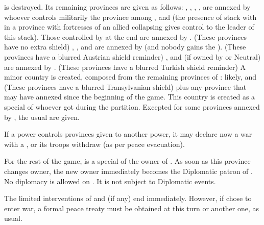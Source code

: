 \aparag \paysHongrie is destroyed. Its remaining provinces are given as
follows:
\bparag \provincePecs, \provinceCroatie, \provinceHongrie, \provinceKarpatok,
\provinceBukovina are annexed by whoever controls militarily the province
among \TUR, \HAB and \POL (the presence of stack with \ARMY\faceplus in a
province with fortresses of an allied collapsing \paysHongrie gives control to
the leader of this stack). Those controlled by \paysHongrie at the end are
annexed by \HAB. (These provinces have no extra shield)
\bparag \provinceSzlovakia, \provinceBalaton, \provinceKranj and
\provinceKapela are annexed by \HAB (and nobody gains the \VP). (These
provinces have a blurred Austrian shield reminder)
\bparag \provinceBanat, \provinceSerbia and \provinceBosnia (if owned by
\paysHongrie or Neutral) are annexed by \TUR. (These provinces have a blurred
Turkish shield reminder)
\bparag A minor country \paysTransylvanie is created, composed from the
remaining provinces of \paysHongrie: likely, \provinceErdely and
\provinceMures (These provinces have a blurred Transylvanian shield) plus any
province that \paysHongrie may have annexed since the beginning of the
game. This country is created as a special \VASSAL of whoever got
\provinceHongrie during the partition.
\bparag Excepted for some provinces annexed by \HAB, the usual \VP are given.

\aparag If a power controls provinces given to another power, it may declare
now a war with a \CB, or its troops withdraw (as per peace evacuation).

\aparag[\paysTransylvanie] [BLP] For the rest of the game, \paysTransylvanie
is a special \VASSAL of the owner of \provinceHongrie.
\bparag As soon as this province changes owner, the new owner immediately
becomes the Diplomatic patron of \paysTransylvanie.
\bparag No diplomacy is allowed on \paysTransylvanie. It is not subject to
Diplomatic events.

\aparag The limited interventions of \HAB and \POL (if any) end immediately.
\bparag However, if \HAB chose to enter war, a formal peace treaty must be
obtained at this turn or another one, as usual.




